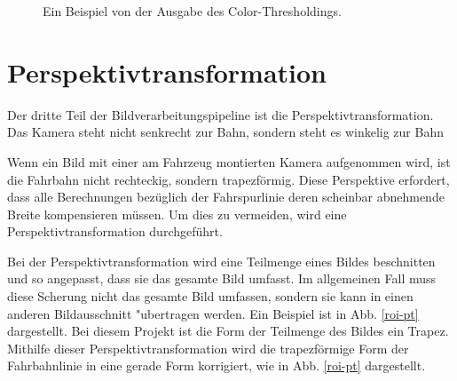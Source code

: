 \documentclass[arbeit=studie,oneside,BCOR=12mm]{ArbeitRST}
\begin{document}
\begin{figure}[h]
    \centering
    \caption{Ein Beispiel von der Ausgabe des Color-Thresholdings.}
    \label{color-thresholding}
\end{figure}

\section{Perspektivtransformation}

Der dritte Teil der Bildverarbeitungspipeline ist die Perspektivtransformation. 
Das Kamera steht nicht senkrecht zur Bahn, sondern steht es winkelig zur Bahn

Wenn ein Bild mit einer am Fahrzeug montierten Kamera aufgenommen wird, ist die
Fahrbahn nicht rechteckig, sondern trapezförmig. Diese Perspektive
erfordert, dass alle Berechnungen bezüglich der Fahrspurlinie deren scheinbar abnehmende
Breite kompensieren müssen. Um dies zu vermeiden, wird eine
Perspektivtransformation durchgeführt. 

Bei der Perspektivtransformation wird eine Teilmenge eines Bildes beschnitten
und so angepasst, dass sie das gesamte Bild umfasst. Im allgemeinen Fall muss
diese Scherung nicht das gesamte Bild umfassen, sondern sie kann in einen
anderen Bildausschnitt "ubertragen werden. Ein Beispiel ist in Abb.
\ref{roi-pt} dargestellt. Bei diesem Projekt ist die Form der Teilmenge des
Bildes ein Trapez. Mithilfe dieser Perspektivtransformation wird die
trapezförmige Form der Fahrbahnlinie in eine gerade Form korrigiert, wie in
Abb. \ref{roi-pt} dargestellt. \\
\end{document}
